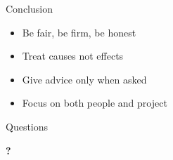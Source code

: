 \documentclass{beamer}
\begin{document}
\begin{frame}{Conclusion}
\begin{itemize}
\item Be fair, be firm, be honest
\item Treat causes not effects
\item Give advice only when asked
\item Focus on both people and project
\end{itemize}
\end{frame}

\begin{frame}{Questions}
  \begin{center}
    \bfseries
    \Huge
    ?
  \end{center}
\end{frame}
\end{document}
